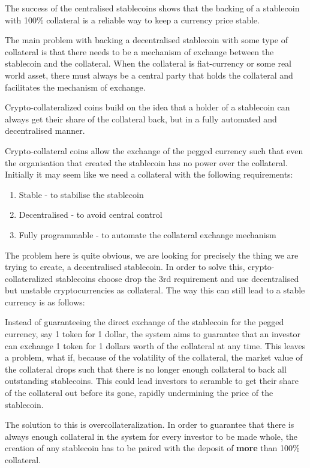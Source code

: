 \documentclass[english,]{IEEEtran}
\providecommand{\tightlist}{%
  \setlength{\itemsep}{0pt}\setlength{\parskip}{0pt}}
\begin{document}
The success of the centralised stablecoins shows that the backing of a
stablecoin with 100\% collateral is a reliable way to keep a currency
price stable.

The main problem with backing a decentralised stablecoin with some type
of collateral is that there needs to be a mechanism of exchange between
the stablecoin and the collateral. When the collateral is fiat-currency
or some real world asset, there must always be a central party that
holds the collateral and facilitates the mechanism of exchange.

Crypto-collateralized coins build on the idea that a holder of a
stablecoin can always get their share of the collateral back, but in a
fully automated and decentralised manner.

Crypto-collateral coins allow the exchange of the pegged currency such
that even the organisation that created the stablecoin has no power over
the collateral. Initially it may seem like we need a collateral with the
following requirements:

\begin{enumerate}
\def\labelenumi{\arabic{enumi}.}
\tightlist
\item
  Stable - to stabilise the stablecoin
\item
  Decentralised - to avoid central control
\item
  Fully programmable - to automate the collateral exchange mechanism
\end{enumerate}

The problem here is quite obvious, we are looking for precisely the
thing we are trying to create, a decentralised stablecoin. In order to
solve this, crypto-collateralized stablecoins choose drop the 3rd
requirement and use decentralised but unstable cryptocurrencies as
collateral. The way this can still lead to a stable currency is as
follows:

Instead of guaranteeing the direct exchange of the stablecoin for the
pegged currency, say 1 token for 1 dollar, the system aims to guarantee
that an investor can exchange 1 token for 1 dollars worth of the
collateral at any time. This leaves a problem, what if, because of the
volatility of the collateral, the market value of the collateral drops
such that there is no longer enough collateral to back all outstanding
stablecoins. This could lead investors to scramble to get their share of
the collateral out before its gone, rapidly undermining the price of the
stablecoin.

The solution to this is overcollateralization. In order to guarantee
that there is always enough collateral in the system for every investor
to be made whole, the creation of any stablecoin has to be paired with
the deposit of \textbf{more} than 100\% collateral.
\end{document}
